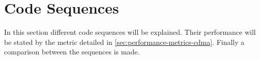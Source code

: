 
\section{Code Sequences}
\label{sec:code-sequences}

In this section different code sequences will be explained.
Their performance will be stated by the metric detailed in \autoref{sec:performance-metrics-cdma}.
Finally a comparison between the sequences is made.









